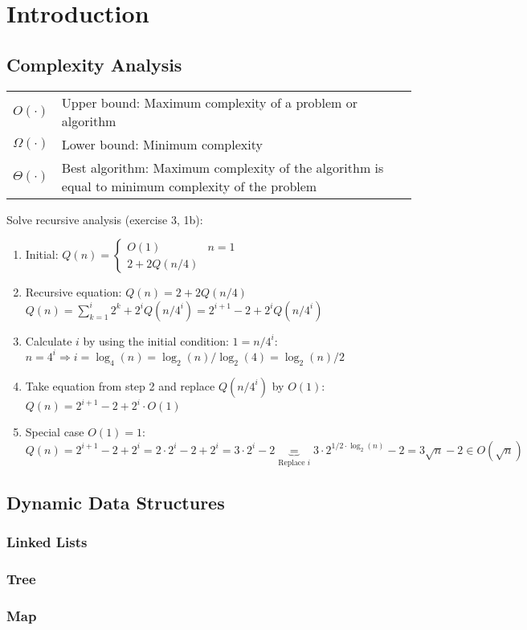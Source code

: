 \section{Introduction}
\subsection{Complexity Analysis}
  \begin{tabular}{ll}
    $O(\cdot)$ & Upper bound: Maximum complexity of a problem or algorithm \\
    $\Omega(\cdot)$ & Lower bound: Minimum complexity\\
    $\Theta(\cdot)$ & Best algorithm: Maximum complexity of the algorithm is equal to minimum complexity of the problem
  \end{tabular}
  
  Solve recursive analysis (exercise 3, 1b):
  \begin{enumerate}
    \item Initial: $Q(n) = \begin{cases}O(1) & n=1\\2+2Q(n/4)\end{cases}$
    \item Recursive equation: $Q(n) = 2+2 Q(n/4)$\\$Q(n) = \sum\limits_{k=1}^i 2^k + 2^i Q(n/4^i) = 2^{i+1}-2 + 2^i Q(n/4^i)$
    \item Calculate $i$ by using the initial condition: $1 = n/4^i$:\\
    $n=4^i  \Rightarrow i = \log_4(n) = \log_2(n) / \log_2(4) = \log_2(n) / 2$
    \item Take equation from step 2 and replace $Q(n/4^i)$ by $O(1)$:\\
    $Q(n) = 2^{i+1} - 2 + 2^i \cdot O(1)$ 
    \item Special case $O(1) = 1$:\\
    $Q(n) = 2^{i+1} - 2 + 2^i = 2 \cdot 2^i - 2 + 2^i = 3 \cdot 2^i -2 
    \underbrace{=}_{\text{Replace }i} 3 \cdot 2^{1/2 \cdot \log_2(n)} - 2 = 3 \sqrt{n} - 2 \in O(\sqrt{n})$
  \end{enumerate}
  
  
\subsection{Dynamic Data Structures}
  \subsubsection{Linked Lists}
  \subsubsection{Tree}
  \subsubsection{Map}